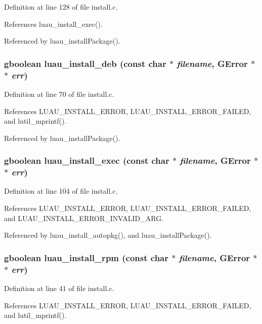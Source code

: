 Definition at line 128 of file install.c.

References luau\_\-install\_\-exec().

Referenced by luau\_\-install\-Package().
\subsubsection{\setlength{\rightskip}{0pt plus 5cm}gboolean luau\_\-install\_\-deb (const char $\ast$ {\em filename}, GError $\ast$$\ast$ {\em err})}\label{install_8h_a1}




Definition at line 70 of file install.c.

References LUAU\_\-INSTALL\_\-ERROR, LUAU\_\-INSTALL\_\-ERROR\_\-FAILED, and lutil\_\-mprintf().

Referenced by luau\_\-install\-Package().
\subsubsection{\setlength{\rightskip}{0pt plus 5cm}gboolean luau\_\-install\_\-exec (const char $\ast$ {\em filename}, GError $\ast$$\ast$ {\em err})}\label{install_8h_a3}




Definition at line 104 of file install.c.

References LUAU\_\-INSTALL\_\-ERROR, LUAU\_\-INSTALL\_\-ERROR\_\-FAILED, and LUAU\_\-INSTALL\_\-ERROR\_\-INVALID\_\-ARG.

Referenced by luau\_\-install\_\-autopkg(), and luau\_\-install\-Package().
\subsubsection{\setlength{\rightskip}{0pt plus 5cm}gboolean luau\_\-install\_\-rpm (const char $\ast$ {\em filename}, GError $\ast$$\ast$ {\em err})}\label{install_8h_a0}




Definition at line 41 of file install.c.

References LUAU\_\-INSTALL\_\-ERROR, LUAU\_\-INSTALL\_\-ERROR\_\-FAILED, and lutil\_\-mprintf().

